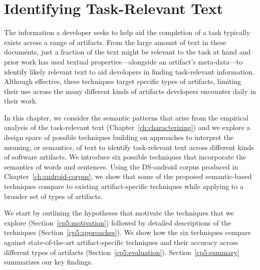 \setcounter{chapter}{4}


\chapter{Identifying Task-Relevant Text}
\label{ch:identifying}

The information a developer seeks to help aid the completion of a task typically exists
across a range of artifacts. 
From the large amount of text
in these documents, just a fraction of the text might be relevant
to the task at hand and prior work has used textual properties---alongside an artifact's meta-data---to
 identify likely relevant text to aid developers in finding task-relevant information.
Although effective, these techniques target specific
types of artifacts, limiting their use across the 
many different kinds of artifacts developers encounter
daily in their work.



In this chapter, we consider the 
semantic patterns that arise from the empirical analysis of the task-relevant text (Chapter~\ref{ch:characterizing})
and we explore a design space of possible techniques building on approaches to interpret the meaning, or semantics, of text
to identify task-relevant text across different kinds of software artifacts.
We introduce six possible techniques that incorporate the  
semantics of words and sentences. 
Using the \acs{DS-android} corpus produced in Chapter~\ref{ch:android-corpus},
we show that some of the proposed semantic-based techniques 
compare to existing artifact-specific techniques 
while applying to a broader set of types of artifacts.





We start by outlining the hypotheses that motivate the techniques that we explore (Section~\ref{cp5:motivation}) followed by detailed descriptions of the
techniques (Section~\ref{cp5:approaches}).
We show how the six techniques 
compare against state-of-the-art artifact-specific techniques and 
their accuracy across different types of artifacts (Section~\ref{cp5:evaluation}). 
Section~\ref{cp5:summary} summarizes our key findings.











